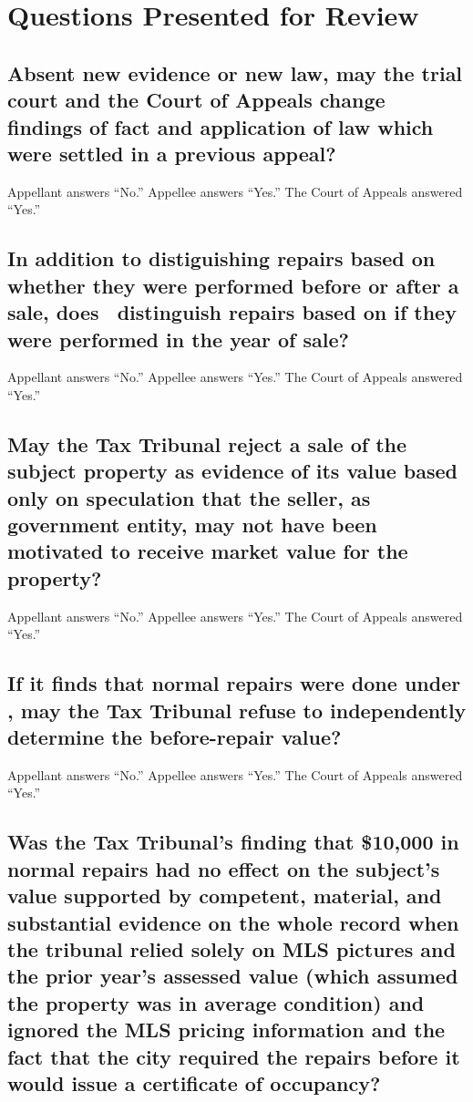 \documentclass[12pt,\documentclassflag]{michiganCourtOfAppealsBrief}
\begin{document}
\newpage
\section{Questions Presented for Review}

\subsection{Absent new evidence or new law, may the trial court and the Court of Appeals change findings of fact and application of law which were settled in a previous appeal?}

\noindent Appellant answers ``No.'' Appellee answers ``Yes.'' The Court of Appeals answered ``Yes.''

\subsection{In addition to distiguishing repairs based on whether they were performed before or after a sale, does \mathieuGast\ distinguish repairs based on if they were performed in the year of sale?}

\noindent Appellant answers ``No.'' Appellee answers ``Yes.'' The Court of Appeals answered ``Yes.''

\subsection{May the Tax Tribunal reject a sale of the subject property as evidence of its value based only on speculation that the seller, as government entity, may not have been motivated to receive market value for the property?}

\noindent Appellant answers ``No.'' Appellee answers ``Yes.'' The Court of Appeals answered ``Yes.''

\subsection{If it finds that normal repairs were done under \mathieuGast, may the Tax Tribunal refuse to independently determine the before-repair value?}

\noindent Appellant answers ``No.'' Appellee answers ``Yes.'' The Court of Appeals answered ``Yes.''

\subsection{Was the Tax Tribunal's finding that \$10,000 in normal repairs had no effect on the subject's value supported by competent, material, and substantial evidence on the whole record when the tribunal relied solely on MLS pictures and the prior year's assessed value (which assumed the property was in average condition) and ignored the MLS pricing information and the fact that the city required the repairs before it would issue a certificate of occupancy?}
\end{document}
